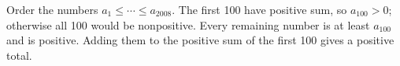Order the numbers $a_1\le\cdots\le a_{2008}$. The first 100 have positive sum, so $a_{100}>0$; otherwise all 100 would be nonpositive. Every remaining number is at least $a_{100}$ and is positive. Adding them to the positive sum of the first 100 gives a positive total.
